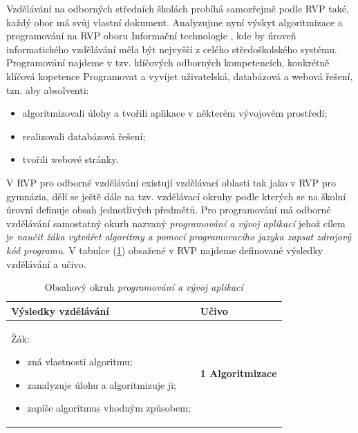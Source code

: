\documentclass[FP,DP]{tulthesis}
\begin{document}
{Vzdělávání na odborných středních školách probíhá samozřejmě podle RVP také, každý obor má svůj vlastní dokument.  Analyzujme nyní výskyt algoritmizace a programování na RVP oboru Informační technologie , kde by úroveň informatického vzdělávání měla být nejvyšší z celého středoškolského systému. Programování najdeme v tzv. klíčových odborných kompetencích, konkrétně klíčová kopetence Programovat a vyvíjet uživatelská, databázová a webová řešení, tzn. aby absolventi: 
 \begin{itemize}
\setlength\itemsep{0.1em}
\item algoritmizovali úlohy a tvořili aplikace v některém vývojovém prostředí; 
\item realizovali databázová řešení;  
\item tvořili webové stránky. 
\end{itemize}
 V RVP pro odborné vzdělávání  existují vzdělávací oblasti tak jako v RVP pro gymnázia, dělí se ještě dále na tzv. vzdělávací okruhy podle kterých se na školní úrovni definuje obsah jednotlivých předmětů. Pro programování má odborné vzdělávání samostatný okurh nazvaný \textit {programování a vývoj aplikací} jehož cílem je \textit {naučit žáka vytvářet algoritmy a pomocí programovacího jazyka zapsat  zdrojový  kód  programu}. V tabulce (\ref{table:1}) obsažené v RVP najdeme definované výsledky vzdělávání a učivo.
{\renewcommand{\arraystretch}{1.4}%
\begin{table}[ht]
\footnotesize
\center
\caption{Obsahový okruh \textit {programování a vývoj aplikací}} \label{table:1}
\begin{tabular}{|l|l|}
\hline
Výsledky vzdělávání & Učivo \\\hline
  \begin{minipage}[t]{0.45\textwidth}
    Žák:
\begin{itemize}[leftmargin=*,nosep]
  	\item zná vlastnosti algoritmu; 
	\item zanalyzuje úlohu a algoritmizuje ji; 
	\item zapíše algoritmus vhodným způsobem; 
\end{itemize}
  \end{minipage} &
  \begin{minipage}[t]{0.45\textwidth}
\textbf{1 Algoritmizace}
    \begin{itemize}[leftmargin=*,nosep]

\end{itemize}
\end{minipage}
\end{tabular}
\end{table}}}
\end{document}

